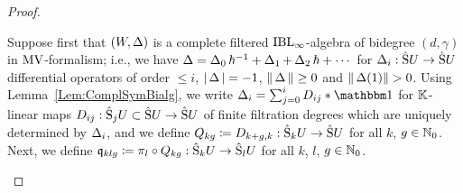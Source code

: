 \documentclass[\MainFolder/Text.tex]{subfiles}
\begin{document}
\begin{proof}
\begin{ProofList}
\item Suppose first that $(W,\operatorname{\Delta})$ is a complete filtered $\mathrm{IBL}_\infty$-algebra of bidegree $(d,\gamma)$ in $\mathrm{MV}$-formalism; i.e., we have $\operatorname{\Delta} = \operatorname{\Delta}_0 \hbar^{-1} + \operatorname{\Delta}_1 + \operatorname{\Delta}_2 \hbar + \dotsb$ for $\operatorname{\Delta}_i: \hat{\mathrm{S}}U \rightarrow \hat{\mathrm{S}}U$ differential operators of order $\le i$, $|\operatorname{\Delta}| = -1$, $\| \operatorname{\Delta} \|\ge 0$ and $\Norm{\BVOp(1)}>0$. Using Lemma~\ref{Lem:ComplSymBialg}, we write $\BVOp_i = \sum_{j=0}^i D_{i j} \Star \Id$ for $\mathbb{K}$-linear maps $D_{ij}:\hat{\mathrm{S}}_j U\subset\hat{\mathrm{S}}U\rightarrow\hat{\mathrm{S}}U$ of finite filtration degrees which are uniquely determined by $\operatorname{\Delta}_i$, and we define $Q_{kg} \coloneqq  D_{k+g,k}: \hat{\mathrm{S}}_{k}U \rightarrow \hat{\mathrm{S}}U$ for all $k$, $g\in \mathbb{N}_0$. Next, we define $\mathfrak{q}_{klg} \coloneqq \pi_l \circ Q_{kg}: \hat{\mathrm{S}}_k U \rightarrow \hat{\mathrm{S}}_l U$ for all $k$, $l$, $g\in \mathbb{N}_0$.


\end{ProofList}
\end{proof}
\end{document}
